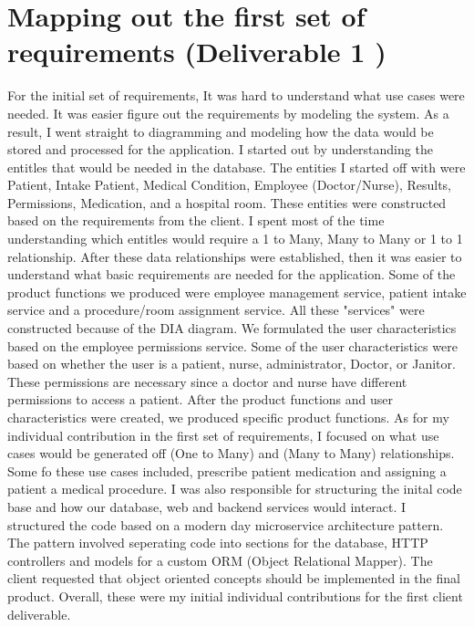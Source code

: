 \documentclass{article}
\begin{document}
\section{Mapping out the first set of requirements (Deliverable 1 )}
\begin{multicols}{2}
For the initial set of requirements, It was hard to understand what use cases were needed. It was easier figure out the requirements by modeling the system. As a result, I went straight to diagramming and modeling how the data would be stored and processed for the application. I started out by understanding the entitles that would be needed in the database. The entities I started off with were Patient, Intake Patient, Medical Condition, Employee (Doctor/Nurse), Results, Permissions, Medication, and a hospital room. These entities were constructed based on the requirements from the client. I spent most of the time understanding which entitles would require a 1 to Many, Many to Many or 1 to 1 relationship. After these data relationships were established, then it was easier to understand what basic requirements are needed for the application. Some of the product functions we produced were employee management service, patient intake service and a procedure/room assignment service. All these "services" were constructed because of the DIA diagram. We formulated the user characteristics based on the employee permissions service. Some of the user characteristics were based on whether the user is a patient, nurse, administrator, Doctor, or Janitor. These permissions are necessary since a doctor and nurse have different permissions to access a patient. After the product functions and user characteristics were created, we produced specific product functions. As for my individual contribution in the first set of requirements, I focused on what use cases would be generated off (One to Many) and (Many to Many) relationships. Some fo these use cases included, prescribe patient medication and assigning a patient a medical procedure. I was also responsible for structuring the inital code base and how our database, web and backend services would interact. I structured the code based on a modern day microservice architecture pattern. The pattern involved seperating code into sections for the database, HTTP controllers and models for a custom ORM (Object Relational Mapper). The client requested that object oriented concepts should be implemented in the final product. Overall, these were my initial individual contributions for the first client deliverable. 


\end{multicols}
\end{document}
